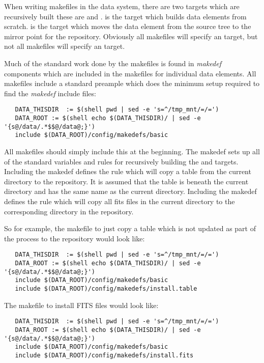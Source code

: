 When writing makefiles in the data system, there are two targets which
are recursively built these are  and . 
is the target which builds data elements from scratch.  is
the target which moves the data element from the source tree to the
mirror point for the repository. Obviously all makefiles will specify
an  target, but not all makefiles will specify an 
target.

Much of the standard work done by the makefiles is found in \textit{makedef}
components which are included in the makefiles for individual data
elements. All makefiles include a standard preample which does the minimum
setup required to find the \textit{makedef} include files:

\begin{verbatim}
   DATA_THISDIR  := $(shell pwd | sed -e 's=^/tmp_mnt/=/=')
   DATA_ROOT := $(shell echo $(DATA_THISDIR)/ | sed -e '{s@/data/.*$$@/data@;}')
   include $(DATA_ROOT)/config/makedefs/basic
\end{verbatim}

\noindent
All makefiles should simply include this at the beginning. The  makedef
sets up all of the standard variables and rules for recursively building the
 and  targets. Including the 
makedef defines the rule which will copy a table from the current directory
to the repository. It is assumed that the table is beneath the current directory
and has the same name as the current directory. Including the 
makedef defines the rule which will copy all fits files in the current directory
to the corresponding directory in the repository.

So for example, the makefile to just copy a table which is not updated as
part of the  process to the repository would look like:

\begin{verbatim}
   DATA_THISDIR  := $(shell pwd | sed -e 's=^/tmp_mnt/=/=')
   DATA_ROOT := $(shell echo $(DATA_THISDIR)/ | sed -e '{s@/data/.*$$@/data@;}')
   include $(DATA_ROOT)/config/makedefs/basic
   include $(DATA_ROOT)/config/makedefs/install.table
\end{verbatim}

\noindent
The makefile to install FITS files would look like:

\begin{verbatim}
   DATA_THISDIR  := $(shell pwd | sed -e 's=^/tmp_mnt/=/=')
   DATA_ROOT := $(shell echo $(DATA_THISDIR)/ | sed -e '{s@/data/.*$$@/data@;}')
   include $(DATA_ROOT)/config/makedefs/basic
   include $(DATA_ROOT)/config/makedefs/install.fits
\end{verbatim}

